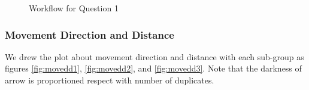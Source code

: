 \documentclass[aps, 10pt, a4paper]{article}
\begin{document}
                \begin{figure}[htbp]
                    \centering
                    \caption{Workflow for Question 1}
                    \label{fig:workflow1}
                \end{figure}
        
            \subsubsection{Movement Direction and Distance}
                We drew the plot about movement direction and distance with each sub-group as figures \ref{fig:movedd1}, \ref{fig:movedd2}, and \ref{fig:movedd3}. Note that the darkness of arrow is proportioned respect with number of duplicates. 
            
\end{document}
